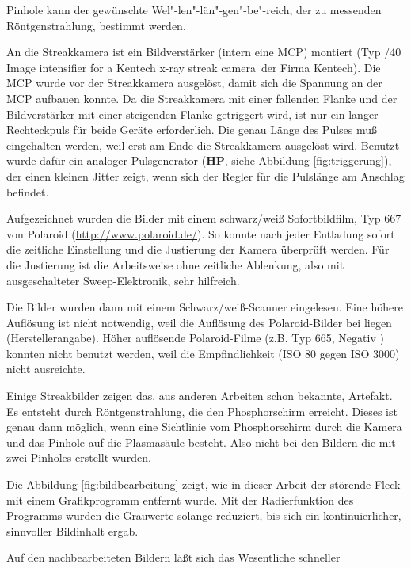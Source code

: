 Pinhole kann der gewünschte Wel"-len"-län"-gen"-be"-reich, der zu
messenden Röntgenstrahlung, bestimmt werden.
\par
An die Streakkamera ist ein Bildverstärker (intern eine MCP) montiert
(Typ /40 Image intensifier for a Kentech x-ray streak
camera\grqq\  der Firma Kentech). Die MCP wurde  vor
der Streakkamera ausgelöst, damit sich die Spannung an der MCP aufbauen
konnte. Da die Streakkamera mit einer fallenden Flanke und der
Bildverstärker mit einer steigenden Flanke getriggert wird, ist nur ein
 langer Rechteckpuls für beide Geräte erforderlich. Die
genau Länge des Pulses muß eingehalten werden, weil erst am Ende die
Streakkamera ausgelöst wird. Benutzt wurde dafür ein analoger
Pulsgenerator ({\bf HP}, siehe Abbildung \vref{fig:triggerung}), der
einen kleinen Jitter zeigt, wenn sich der Regler für die Pulslänge am
Anschlag befindet.
\par
Aufgezeichnet wurden die Bilder mit einem schwarz/weiß Sofortbildfilm,
Typ 667 von Polaroid (\url{http://www.polaroid.de/}). So konnte nach
jeder Entladung sofort die zeitliche Einstellung und die Justierung der
Kamera überprüft werden. Für die Justierung ist die Arbeitsweise ohne
zeitliche Ablenkung, also mit ausgeschalteter Sweep-Elektronik, sehr
hilfreich.
\par
Die Bilder wurden dann mit einem  Schwarz/weiß-Scanner
eingelesen. Eine höhere Auflösung ist nicht notwendig, weil die
Auflösung des Polaroid-Bilder bei  liegen
(Herstellerangabe). Höher auflösende Polaroid-Filme (z.B. Typ 665,
Negativ ) konnten nicht benutzt werden, weil
die Empfindlichkeit (ISO 80 gegen ISO 3000) nicht ausreichte.
\par
\label{streaknachbearbeitung} Einige Streakbilder zeigen das, aus
anderen Arbeiten \cite{maelzig:phd,roewe:phd} schon bekannte, Artefakt.
Es entsteht durch Röntgenstrahlung, die den Phosphorschirm erreicht.
Dieses ist genau dann möglich, wenn eine Sichtlinie vom Phosphorschirm
durch die Kamera und das Pinhole auf die Plasmasäule besteht. Also
nicht bei den Bildern die mit zwei Pinholes erstellt wurden.
\par
Die Abbildung \vref{fig:bildbearbeitung} zeigt, wie in dieser Arbeit
der störende Fleck mit einem Grafikprogramm entfernt wurde. Mit der
Radierfunktion des Programms wurden die Grauwerte solange reduziert,
bis sich ein kontinuierlicher, sinnvoller Bildinhalt ergab.
\par
Auf den nachbearbeiteten Bildern läßt sich das Wesentliche schneller
